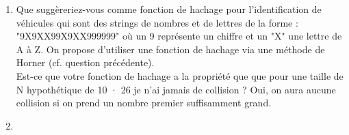 \documentclass[11pt]{article}
\begin{document}
\begin{enumerate}
\item Que suggèreriez-vous comme fonction de hachage pour l’identification de véhicules
qui sont des strings de nombres et de lettres de la forme : "9X9XX99X9XX999999"
où un 9 représente un chiffre et un "X" une lettre de A à Z. 
{\color{dkgreen}On propose d'utiliser une fonction de hachage via une méthode de Horner (cf. question précédente). }
\\Est-ce que votre fonction de hachage a la propriété que que pour une taille de N hypothétique de 10 · 26 je n’ai jamais de collision ?
{\color{dkgreen}Oui, on aura aucune collision si on prend un nombre premier suffisamment grand.}

\item
\end{enumerate}
\end{document}
